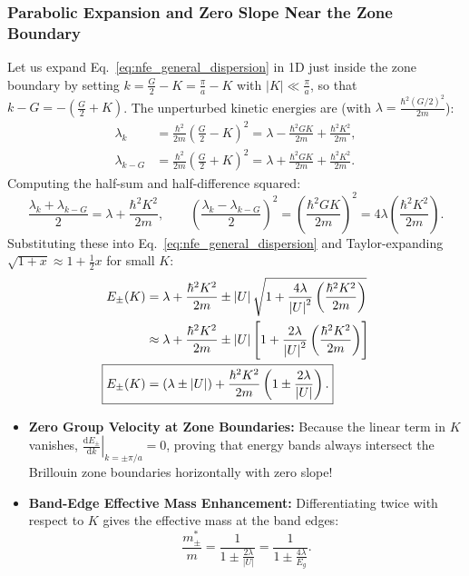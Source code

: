 \documentclass[11pt,a4paper]{article}
\newcommand{\abs}[1]{\left|#1\right|}
\newcommand{\dv}[2]{\frac{\mathrm{d}#1}{\mathrm{d}#2}}
\newcommand{\hb}{\hbar}
\newcommand{\hbarsq}{\hb^2}
\begin{document}
\subsubsection{Parabolic Expansion and Zero Slope Near the Zone Boundary}
Let us expand Eq.~\eqref{eq:nfe_general_dispersion} in 1D just inside the zone boundary by setting $k = \frac{G}{2} - K = \frac{\pi}{a} - K$ with $\abs{K} \ll \frac{\pi}{a}$, so that $k - G = -\left(\frac{G}{2} + K\right)$. The unperturbed kinetic energies are (with $\lambda = \frac{\hbarsq (G/2)^2}{2m}$):
\begin{align}
    \lambda_k &= \frac{\hbarsq}{2m}\left(\frac{G}{2} - K\right)^2 = \lambda - \frac{\hbarsq G K}{2m} + \frac{\hbarsq K^2}{2m}, \\
    \lambda_{k-G} &= \frac{\hbarsq}{2m}\left(\frac{G}{2} + K\right)^2 = \lambda + \frac{\hbarsq G K}{2m} + \frac{\hbarsq K^2}{2m}.
\end{align}
Computing the half-sum and half-difference squared:
\begin{equation}
    \frac{\lambda_k + \lambda_{k-G}}{2} = \lambda + \frac{\hbarsq K^2}{2m}, \qquad \left(\frac{\lambda_k - \lambda_{k-G}}{2}\right)^2 = \left(\frac{\hbarsq G K}{2m}\right)^2 = 4\lambda\left(\frac{\hbarsq K^2}{2m}\right).
\end{equation}
Substituting these into Eq.~\eqref{eq:nfe_general_dispersion} and Taylor-expanding $\sqrt{1 + x} \approx 1 + \frac{1}{2}x$ for small $K$:
\begin{align}
    E_\pm(K) &= \lambda + \frac{\hbarsq K^2}{2m} \pm \abs{U}\sqrt{1 + \frac{4\lambda}{\abs{U}^2}\left(\frac{\hbarsq K^2}{2m}\right)} \notag\\
    &\approx \lambda + \frac{\hbarsq K^2}{2m} \pm \abs{U}\left[ 1 + \frac{2\lambda}{\abs{U}^2}\left(\frac{\hbarsq K^2}{2m}\right) \right] \notag\\
    \Aboxed{E_\pm(K) &= (\lambda \pm \abs{U}) + \frac{\hbarsq K^2}{2m}\left(1 \pm \frac{2\lambda}{\abs{U}}\right).}
    \label{eq:nfe_parabolic_edge}
\end{align}
\begin{itemize}
    \item \textbf{Zero Group Velocity at Zone Boundaries:} Because the linear term in $K$ vanishes, $\left.\dv{E_\pm}{k}\right|_{k=\pm\pi/a} = 0$, proving that energy bands always intersect the Brillouin zone boundaries horizontally with zero slope!
    \item \textbf{Band-Edge Effective Mass Enhancement:} Differentiating twice with respect to $K$ gives the effective mass at the band edges:
    \begin{equation}
        \boxed{\frac{m_\pm^*}{m} = \frac{1}{1 \pm \frac{2\lambda}{\abs{U}}} = \frac{1}{1 \pm \frac{4\lambda}{E_g}}.}
        \label{eq:nfe_mstar_formula}
    \end{equation}
\end{itemize}
\end{document}
